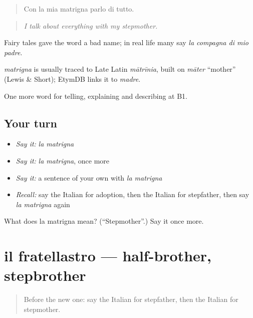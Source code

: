 \begin{quote}
Con la mia matrigna parlo di tutto.
\end{quote}

\begin{quote}
\emph{I talk about everything with my stepmother.}
\end{quote}

Fairy tales gave the word a bad name; in real life many say \emph{la compagna di mio padre}.

\begin{cousinweb}
\emph{matrigna} is usually traced to Late Latin \emph{mātrīnia}, built on \emph{māter} \textquotedblleft{}mother\textquotedblright{} (Lewis \& Short); EtymDB links it to \emph{madre}.
\end{cousinweb}

\begin{grammarlens}[title={What you've built}]
One more word for telling, explaining and describing at B1.
\end{grammarlens}

\subsection*{Your turn}
\begin{itemize}
\raggedright
  \item \emph{Say it:} \emph{la matrigna}
  \item \emph{Say it:} \emph{la matrigna}, once more
  \item \emph{Say it:} a sentence of your own with \emph{la matrigna}
  \item \emph{Recall:} say the Italian for adoption, then the Italian for stepfather, then say \emph{la matrigna} again
\end{itemize}

\begin{tcolorbox}[breakable,colback=teal!4,colframe=teal!35!black,title={Before you move on}]
What does la matrigna mean? (\textquotedblleft{}Stepmother\textquotedblright{}.) Say it once more.
\end{tcolorbox}
\section[il fratellastro]{il fratellastro — half-brother, stepbrother}

\label{lesson:IT-C495-fratellastro}



\begin{quote}
Before the new one: say the Italian for stepfather, then the Italian for stepmother.
\end{quote}

